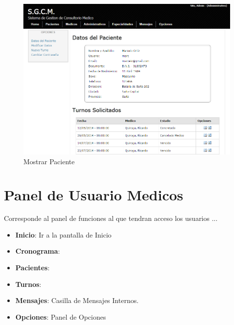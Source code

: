 \begin{figure}[H]
    \centering
    \includegraphics[scale=0.5]{resourse/datos-paciente-a.png}
    \caption{Mostrar Paciente}
    \label{fig:613}
\end{figure}



\section{Panel de Usuario Medicos}

Corresponde al panel de funciones al que tendran acceso los usuarios ...

\begin{itemize}
    \item \textbf{Inicio}: Ir a la pantalla de Inicio
    \item \textbf{Cronograma}:
    \item \textbf{Pacientes}:
    \item \textbf{Turnos}: 
    \item \textbf{Mensajes}: Casilla de Mensajes Internos.
    \item \textbf{Opciones}: Panel de Opciones
\end{itemize}
